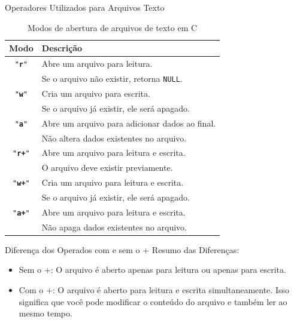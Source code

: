 \begin{frame}{Operadores Utilizados para Arquivos Texto}
    \begin{table}[h]
    \centering
    \begin{tabular}{|c|l|}
        \hline
        \textbf{Modo} & \textbf{Descrição} \\
        \hline
        \texttt{"\textbf{r}"}   & Abre um arquivo para leitura. \\
                        & Se o arquivo não existir, retorna \texttt{NULL}. \\
        \hline
        \texttt{"\textbf{w}"}   & Cria um arquivo para escrita. \\
                        & Se o arquivo já existir, ele será apagado. \\
        \hline
        \texttt{"\textbf{a}"}   & Abre um arquivo para adicionar dados ao final. \\
                        & Não altera dados existentes no arquivo. \\
        \hline
        \texttt{"\textbf{r+}"}  & Abre um arquivo para leitura e escrita. \\
                        & O arquivo deve existir previamente. \\
        \hline
        \texttt{"\textbf{w+}"}  & Cria um arquivo para leitura e escrita. \\
                        & Se o arquivo já existir, ele será apagado. \\
        \hline
        \texttt{"\textbf{a+}"}  & Abre um arquivo para leitura e escrita. \\
                        & Não apaga dados existentes no arquivo. \\
        \hline
    \end{tabular}
    \caption{Modos de abertura de arquivos de texto em C}
    \label{tab:modos_arquivo_texto}
\end{table}
\end{frame}


\begin{frame}{Diferença dos Operados com e sem o +}
Resumo das Diferenças:
\begin{itemize}
    \item Sem o +: O arquivo é aberto apenas para leitura ou apenas para escrita.
    \item Com o +: O arquivo é aberto para leitura e escrita simultaneamente. Isso significa que você pode modificar o conteúdo do arquivo e também ler ao mesmo tempo.
\end{itemize}
\end{frame}


